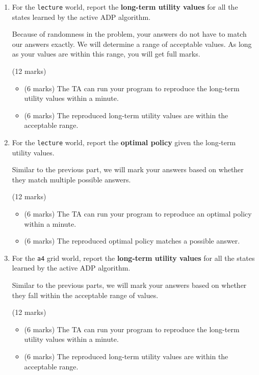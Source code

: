 \documentclass[12pt]{article}
\begin{document}
\begin{enumerate}
\item For the \verb+lecture+ world, report the {\bf long-term utility values} for all the states learned by the active ADP algorithm. 

Because of randomness in the problem, your answers do not have to match our answers exactly. We will determine a range of acceptable values. As long as your values are within this range, you will get full marks.

\begin{markscheme}
(12 marks)

\begin{itemize}
    \item (6 marks) The TA can run your program to reproduce the long-term utility values within a minute.
    \item (6 marks) The reproduced long-term utility values are within the acceptable range.
\end{itemize}
\end{markscheme}


\item For the \verb+lecture+ world, report the {\bf optimal policy} given the long-term utility values. 

Similar to the previous part, we will mark your answers based on whether they match multiple possible answers.

\begin{markscheme}
(12 marks)

\begin{itemize}
    \item (6 marks) The TA can run your program to reproduce an optimal policy within a minute.
    \item (6 marks) The reproduced optimal policy matches a possible answer.
\end{itemize}
\end{markscheme}



\item For the \verb+a4+ grid world, report the {\bf long-term utility values} for all the states learned by the active ADP algorithm.

Similar to the previous parts, we will mark your answers based on whether they fall within the acceptable range of values.

\begin{markscheme}
(12 marks)

\begin{itemize}
    \item (6 marks) The TA can run your program to reproduce the long-term utility values within a minute.
    \item (6 marks) The reproduced long-term utility values are within the acceptable range.
\end{itemize}
\end{markscheme}





\end{enumerate}
\end{document}
